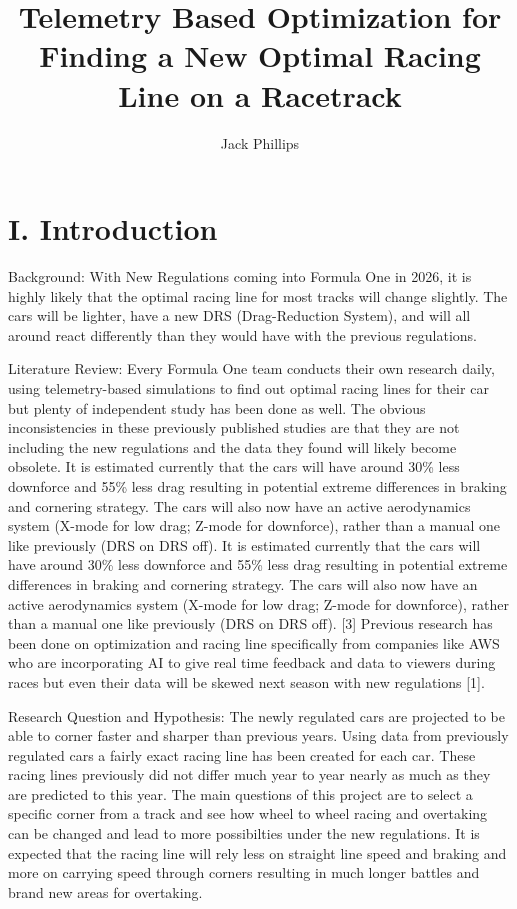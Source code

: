 \documentclass[11pt]{article} %
\title{Telemetry Based Optimization for Finding a New Optimal Racing Line on a Racetrack}
\author{Jack Phillips}
\begin{document}
\maketitle

\section{I.	Introduction}

Background: With New Regulations coming into Formula One in 2026, it is highly likely that the optimal racing line for most tracks will change slightly. The cars will be lighter, have a new DRS (Drag-Reduction System), and will all around react differently than they would have with the previous regulations. 

Literature Review: Every Formula One team conducts their own research daily, using telemetry-based simulations to find out optimal racing lines for their car but plenty of independent study has been done as well. The obvious inconsistencies in these previously published studies are that they are not including the new regulations and the data they found will likely become obsolete. It is estimated currently that the cars will have around 30\% less downforce and 55\% less drag resulting in potential extreme differences in braking and cornering strategy. The cars will also now have an active aerodynamics system (X-mode for low drag; Z-mode for downforce), rather than a manual one like previously (DRS on DRS off).
It is estimated currently that the cars will have around 30\% less downforce and 55\% less drag resulting in potential extreme differences in braking and cornering strategy. The cars will also now have an active aerodynamics system (X-mode for low drag; Z-mode for downforce), rather than a manual one like previously (DRS on DRS off). [3] Previous research has been done on optimization and racing line specifically from companies like AWS who are incorporating AI to give real time feedback and data to viewers during races but even their data will be skewed next season with new regulations [1]. 

Research Question and Hypothesis: The newly regulated cars are projected to be able to corner faster and sharper than previous years. Using data from previously regulated cars a fairly exact racing line has been created for each car. These racing lines previously did not differ much year to year nearly as much as they are predicted to this year. The main questions of this project are to select a specific corner from a track and see how wheel to wheel racing and overtaking can be changed and lead to more possibilties under the new regulations. It is expected that the racing line will rely less on straight line speed and braking and more on carrying speed through corners resulting in much longer battles and brand new areas for overtaking.
\end{document}
